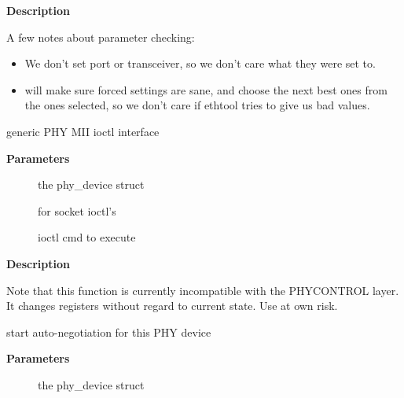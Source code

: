 \documentclass[a4paper,8pt,english]{sphinxmanual}
\begin{document}
\textbf{Description}

A few notes about parameter checking:
\begin{itemize}
\item {} 
We don't set port or transceiver, so we don't care what they
were set to.

\item {} 
{\hyperref[networking/kapi:c.phy_start_aneg]{\emph{}}} will make sure forced settings are sane, and
choose the next best ones from the ones selected, so we don't
care if ethtool tries to give us bad values.

\end{itemize}

\begin{fulllineitems}
\label{networking/kapi:c.phy_mii_ioctl}
generic PHY MII ioctl interface

\end{fulllineitems}


\textbf{Parameters}
\begin{description}
\item[{}] \leavevmode
the phy\_device struct

\item[{}] \leavevmode
{} for socket ioctl's

\item[{}] \leavevmode
ioctl cmd to execute

\end{description}

\textbf{Description}

Note that this function is currently incompatible with the
PHYCONTROL layer.  It changes registers without regard to
current state.  Use at own risk.

\begin{fulllineitems}
\label{networking/kapi:c.phy_start_aneg}
start auto-negotiation for this PHY device

\end{fulllineitems}


\textbf{Parameters}
\begin{description}
\item[{}] \leavevmode
the phy\_device struct

\end{description}
\end{document}
